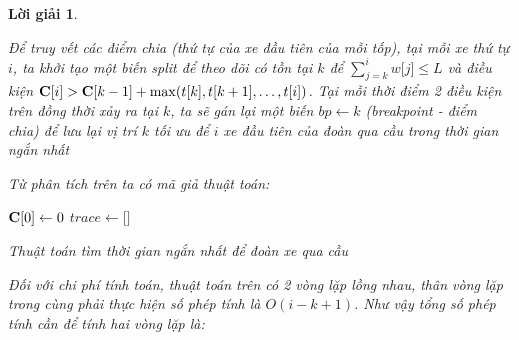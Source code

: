 \documentclass[14pt, a4paper]{article}
\theoremstyle{sltheorem}
\theoremstyle{soltheorem}
\newtheorem*{loigiai}{Lời giải}
\begin{document}
\begin{loigiai}
\begin{itemize} [label={$-$}]
        Để truy vết các điểm chia (thứ tự của xe đầu tiên của mỗi tốp), tại mỗi xe thứ tự $i$, ta khởi tạo một biến split để theo dõi có tồn tại $k$ để $\sum_{j=k}^i w \lbrack j \rbrack \leq L$ và điều kiện $\bold{C} \lbrack i \rbrack > \bold{C} \lbrack k - 1\rbrack + \max ( t\lbrack k \rbrack , t\lbrack k + 1\rbrack , \dots , t\lbrack i \rbrack)$.
        Tại mỗi thời điểm 2 điều kiện trên đồng thời xảy ra tại $k$, ta sẽ gán lại một biến $bp \gets k$ (breakpoint - điểm chia) để lưu lại vị trí $k$ tối ưu để $i$ xe đầu tiên của đoàn qua cầu trong thời gian ngắn nhất


        Từ phân tích trên ta có mã giả thuật toán:

        \begin{algorithm}
            \DontPrintSemicolon

            $\bold{C} \lbrack 0 \rbrack \gets 0$\;
            $trace \gets \lbrack \rbrack$\;
            \;
            \caption{Thuật toán tìm thời gian ngắn nhất để đoàn xe qua cầu}
        \end{algorithm}

        Đối với chi phí tính toán, thuật toán trên có 2 vòng lặp lồng nhau, thân vòng lặp trong cùng phải thực hiện số phép tính là $O(i-k+1)$.
        Như vậy tổng số phép tính cần để tính hai vòng lặp là:


\end{itemize}
\end{loigiai}
\end{document}
